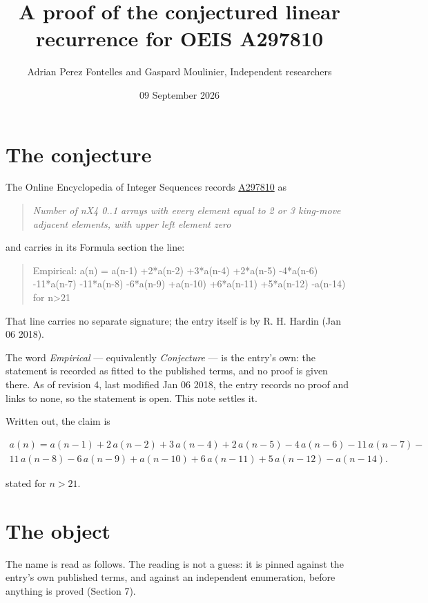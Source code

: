 \documentclass[11pt]{article}
\title{A proof of the conjectured linear recurrence for OEIS A297810}
\author{Adrian Perez Fontelles and Gaspard Moulinier, Independent researchers}
\date{09 September 2026}
\theoremstyle{definition}
\begin{document}
\maketitle
\section{The conjecture}

The Online Encyclopedia of Integer Sequences records \href{https://oeis.org/A297810}{A297810} as

\begin{quote}\itshape Number of nX4 0..1 arrays with every element equal to 2 or 3 king-move adjacent elements, with upper left element zero\end{quote}

and carries in its Formula section the line:

\begin{quote}\ttfamily Empirical: a(n) = a(n-1) +2*a(n-2) +3*a(n-4) +2*a(n-5) -4*a(n-6) -11*a(n-7) -11*a(n-8) -6*a(n-9) +a(n-10) +6*a(n-11) +5*a(n-12) -a(n-14) for n>21\end{quote}

That line carries no separate signature; the entry itself is by R. H. Hardin (Jan 06 2018).

The word {\itshape Empirical} --- equivalently {\itshape Conjecture} --- is the entry's own: the statement is recorded as fitted to the published terms, and no proof is given there. As of revision 4, last modified Jan 06 2018, the entry records no proof and links to none, so the statement is open. This note settles it.

Written out, the claim is

\begin{multline*} a(n) = a(n-1) + 2\,a(n-2) + 3\,a(n-4) + 2\,a(n-5) - 4\,a(n-6) - 11\,a(n-7) - \\ 11\,a(n-8) - 6\,a(n-9) + a(n-10) + 6\,a(n-11) + 5\,a(n-12) - a(n-14). \end{multline*}

stated for $n > 21$.

\section{The object}

The name is read as follows. The reading is not a guess: it is pinned against the entry's own published terms, and against an independent enumeration, before anything is proved (Section 7).
\end{document}

